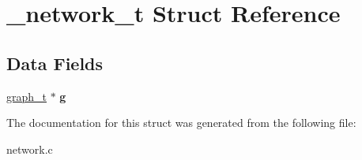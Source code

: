 \hypertarget{struct__network__t}{}\section{\+\_\+network\+\_\+t Struct Reference}
\label{struct__network__t}
\subsection*{Data Fields}
\begin{DoxyCompactItemize}
\item 
\hypertarget{struct__network__t_a7a275986ccd187d83e02c7985094ca13}{}\hyperlink{struct__graph__t}{graph\+\_\+t} $\ast$ {\bfseries g}\label{struct__network__t_a7a275986ccd187d83e02c7985094ca13}

\end{DoxyCompactItemize}


The documentation for this struct was generated from the following file\+:\begin{DoxyCompactItemize}
\item 
network.\+c\end{DoxyCompactItemize}
